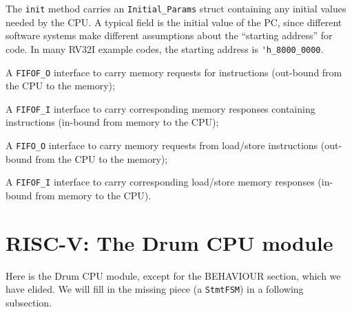 \begin{tightlist}

  \item The \verb|init| method carries an \verb|Initial_Params| struct
    containing any initial values needed by the CPU.  A typical field
    is the initial value of the PC, since different software systems
    make different assumptions about the ``starting address'' for
    code.  In many RV32I example codes, the starting address is
    \verb|'h_8000_0000|.

  \item A \verb|FIFOF_O| interface to carry memory requests for
    instructions (out-bound from the CPU to the memory);

  \item A \verb|FIFOF_I| interface to carry corresponding memory
    responses containing instructions (in-bound from memory to the
    CPU);

  \item A \verb|FIFO_O| interface to carry memory requests from
    load/store instructions (out-bound from the CPU to the memory);

  \item A \verb|FIFOF_I| interface to carry corresponding load/store
    memory responses (in-bound from memory to the CPU).

\end{tightlist}


\section{RISC-V: The Drum CPU module}

\label{Sec_Drum_CPU_module}


Here is the Drum CPU module, except for the BEHAVIOUR section, which
we have elided.  We will fill in the missing piece (a {\tt StmtFSM})
in a following subsection.

